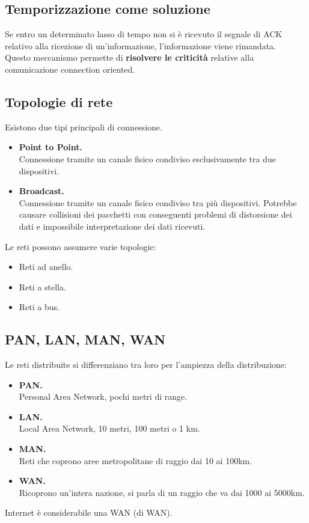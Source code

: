 \subsection{Temporizzazione come soluzione}
Se entro un determinato lasso di tempo non si è ricevuto il segnale di ACK relativo alla ricezione di un'informazione, l'informazione viene rimandata.\\
Questo meccanismo permette di \textbf{risolvere le criticità} relative alla comunicazione connection oriented.


\subsection{Topologie di rete}
Esistono due tipi principali di connessione.
\begin{itemize}
    \item \textbf{Point to Point.}\\
    Connessione tramite un canale fisico condiviso esclusivamente tra due dispositivi.
    \item \textbf{Broadcast.}\\
    Connessione tramite un canale fisico condiviso tra più dispositivi. Potrebbe causare collisioni dei pacchetti con conseguenti problemi di distorsione dei dati e impossibile interpretazione dei dati ricevuti.
\end{itemize}

Le reti possono assumere varie topologie:
\begin{itemize}
    \item Reti ad anello.
    \item Reti a stella.
    \item Reti a bus.
\end{itemize}

\subsection{PAN, LAN, MAN, WAN}
Le reti distribuite si differenziano tra loro per l'ampiezza della distribuzione:
\begin{itemize}
    \item \textbf{PAN.}\\
    Personal Area Network, pochi metri di range.
    \item \textbf{LAN.}\\
    Local Area Network, 10 metri, 100 metri o 1 km.
    \item \textbf{MAN.}\\
    Reti che coprono aree metropolitane di raggio dai 10 ai 100km.
    \item \textbf{WAN.}\\
    Ricoprono un'intera nazione, si parla di un raggio che va dai 1000 ai 5000km.
\end{itemize}
Internet è considerabile una WAN (di WAN).
